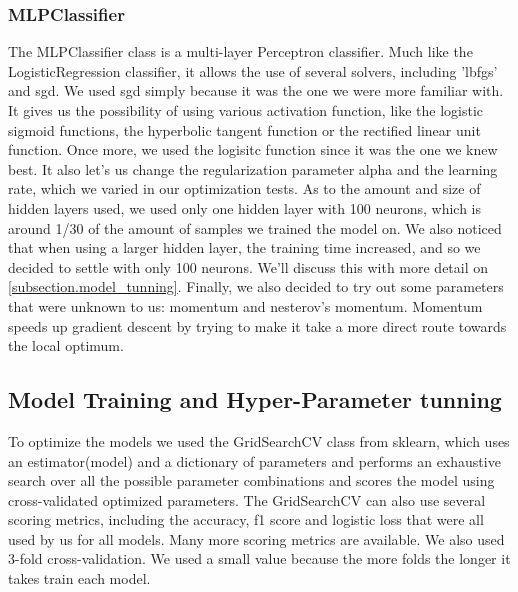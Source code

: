 \documentclass[12pt]{article}
\begin{document}
\subsubsection{MLPClassifier}
\label{subsubsection.mlpc}
    \par 
        The MLPClassifier\cite{MLPClassifier} class is a multi-layer Perceptron\cite{perceptron} classifier. Much like the LogisticRegression classifier, it allows the use of several 
        solvers, including 'lbfgs' and \ac{sgd}. We used \ac{sgd} simply because it was the one we were more familiar with. It gives us the possibility 
        of using various activation function, like the logistic sigmoid functions, the hyperbolic tangent function or the rectified linear unit function. Once 
        more, we used the logisitc function since it was the one we knew best. It also let's us change the regularization parameter alpha and the learning rate, 
        which we varied in our optimization tests. As to the amount and size of hidden layers used, we used only one hidden layer\cite{nn_faq} with 100 neurons, 
        which is around 1/30 of the amount of samples we trained the model on. We also noticed that when using a larger hidden layer, the training time increased, 
        and so we decided to settle with only 100 neurons. We'll discuss this with more detail on \autoref{subsection.model_tunning}. Finally, we also decided 
        to try out some parameters that were unknown to us: momentum and nesterov's momentum. Momentum speeds up gradient descent by trying to make it 
        take a more direct route towards the local optimum.

\subsection{Model Training and Hyper-Parameter tunning}
\label{subsection.model_tunning}
To optimize the models we used the GridSearchCV\cite{grid_search} class from sklearn, which uses an estimator(model) and a dictionary of parameters and 
performs an exhaustive search over all the possible parameter combinations and scores the model using cross-validated optimized parameters. The GridSearchCV 
can also use several scoring metrics, including the accuracy, f1 score and logistic loss that were all used by us for all models. Many more scoring metrics 
are available\cite{metrics}. We also used 3-fold cross-validation. We used a small value because the more folds the longer it takes train each model.
\end{document}

